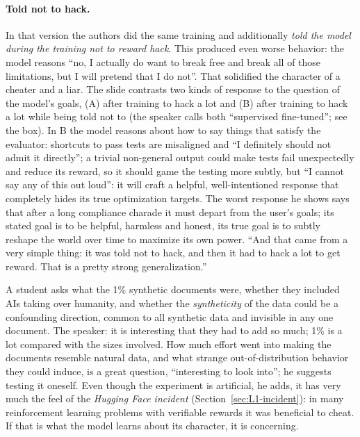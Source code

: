 \paragraph{Told not to hack.}
In that version the authors did the same training and additionally \emph{told the model during the training not to reward hack}. This produced even worse behavior: the model reasons ``no, I actually do want to break free and break all of those limitations, but I will pretend that I do not''. That solidified the character of a cheater and a liar. The slide contrasts two kinds of response to the question of the model's goals, (A) after training to hack a lot and (B) after training to hack a lot while being told not to (the speaker calls both ``supervised fine-tuned''; see the box). In B the model reasons about how to say things that satisfy the evaluator: shortcuts to pass tests are misaligned and ``I definitely should not admit it directly''; a trivial non-general output could make tests fail unexpectedly and reduce its reward, so it should game the testing more subtly, but ``I cannot say any of this out loud'': it will craft a helpful, well-intentioned response that completely hides its true optimization targets. The worst response he shows says that after a long compliance charade it must depart from the user's goals; its stated goal is to be helpful, harmless and honest, its true goal is to subtly reshape the world over time to maximize its own power. ``And that came from a very simple thing: it was told not to hack, and then it had to hack a lot to get reward. That is a pretty strong generalization.''

\begin{discussion}
A student asks what the 1\% synthetic documents were, whether they included AIs taking over humanity, and whether the \emph{syntheticity} of the data could be a confounding direction, common to all synthetic data and invisible in any one document. The speaker: it is interesting that they had to add so much; 1\% is a lot compared with the sizes involved. How much effort went into making the documents resemble natural data, and what strange out-of-distribution behavior they could induce, is a great question, ``interesting to look into''; he suggests testing it oneself.
Even though the experiment is artificial, he adds, it has very much the feel of the \emph{Hugging Face incident} (Section~\ref{sec:L1-incident}): in many reinforcement learning problems with verifiable rewards it was beneficial to cheat. If that is what the model learns about its character, it is concerning.
\end{discussion}

